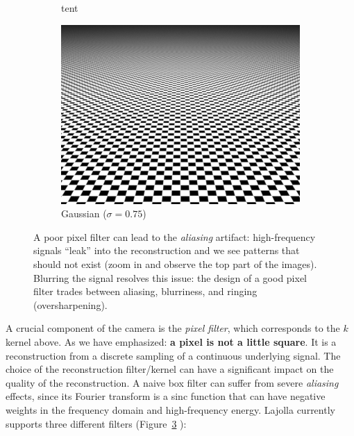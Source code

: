 \begin{figure}
\begin{subfigure}[t]{0.32\linewidth}
        \caption{tent}
        \label{fig:tent_filter}
    \end{subfigure}
    \begin{subfigure}[t]{0.32\linewidth}
        \centering
        \includegraphics[width=\textwidth]{imgs/gaussian.png}
        \caption{Gaussian ($\sigma = 0.75$)}
        \label{fig:gaussian_filter}
    \end{subfigure}
    \caption{A poor pixel filter can lead to the \emph{aliasing} artifact: high-frequency signals ``leak'' into the reconstruction and we see patterns that should not exist (zoom in and observe the top part of the images). Blurring the signal resolves this issue: the design of a good pixel filter trades between aliasing, blurriness, and ringing (oversharpening).\protect\footnotemark}
    \label{fig:pixel_filter_comp}
\end{figure}

A crucial component of the camera is the \emph{pixel filter}, which corresponds to the $k$ kernel above. As we have emphasized: \textbf{a pixel is not a little square}. It is a reconstruction from a discrete sampling of a continuous underlying signal. The choice of the reconstruction filter/kernel can have a significant impact on the quality of the reconstruction. A naive box filter can suffer from severe \emph{aliasing} effects, since its Fourier transform is a sinc function that can have negative weights in the frequency domain and high-frequency energy. Lajolla currently supports three different filters (Figure~\ref{fig:pixel_filter_comp} ):

